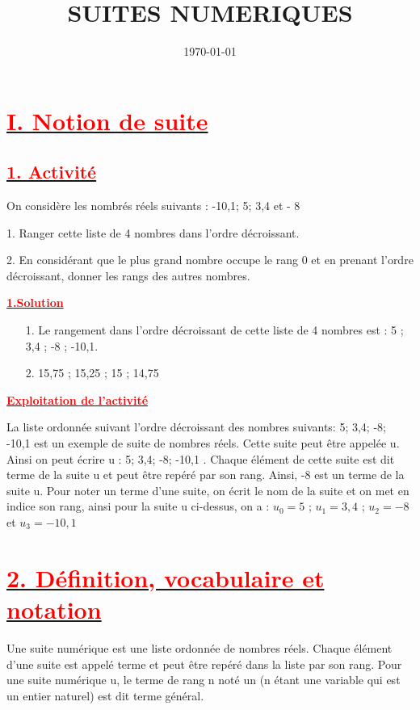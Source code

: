 \documentclass[12pt]{article}
\author{}
\title{\textbf{SUITES NUMERIQUES}}
\date{\today}
\begin{document}
\maketitle
\newpage

\section*{\underline{\textbf{\textcolor{red}{I. Notion de suite}}}} 
\subsection*{\underline{\textbf{\textcolor{red}{1. Activité}}}} 
On considère les nombrés réels suivants : -10,1; 5; 3,4 et - 8

1. Ranger cette liste de 4 nombres dans l’ordre décroissant.

2. En considérant que le plus grand nombre occupe le rang 0 et en prenant l’ordre décroissant, donner les
rangs des autres nombres.

\underline{\textbf{\textcolor{red}{1.Solution}}}
\begin{itemize}
\item[1.]Le rangement dans l’ordre décroissant de cette liste de 4 nombres est : 5 ; 3,4 ; -8 ; -10,1.

\item[2.] 15,75 ; 15,25 ; 15 ; 14,75
\end{itemize}
\underline{\textbf{\textcolor{red}{Exploitation de l'activité}}}

La liste ordonnée suivant l’ordre décroissant des nombres suivants: 5; 3,4; -8; -10,1 est un exemple de suite de
nombres réels. Cette suite peut être appelée u. Ainsi on peut écrire u : 5; 3,4; -8; -10,1 . Chaque élément de cette suite est dit terme de la suite u et peut être repéré par son rang. Ainsi, -8 est un terme de la suite u. Pour noter un terme d’une suite, on écrit le nom de la suite et on met en indice son rang, ainsi pour la suite u ci-dessus, on a : $u_{0}=5$ ; $u_{1}=3,4$ ; $u_{2}=-8$ et $u_{3}=-10,1$
\section*{\underline{\textbf{\textcolor{red}{2. Définition, vocabulaire et notation}}}}
Une suite numérique est une liste ordonnée de nombres réels. Chaque élément d’une suite est appelé terme
et peut être repéré dans la liste par son rang. Pour une suite numérique u, le terme de rang n noté un (n étant
une variable qui est un entier naturel) est dit terme général.
\end{document}
